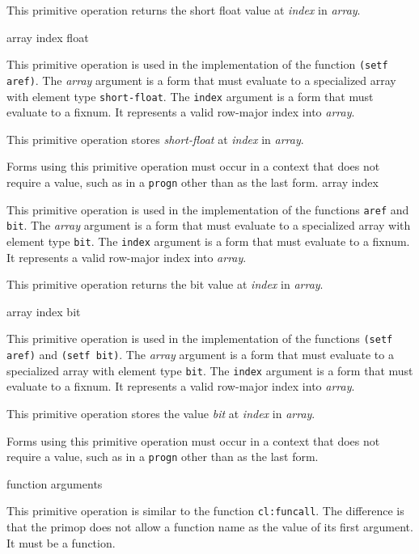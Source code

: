 This primitive operation returns the short float value at
\textit{index} in \textit{array}.

 {array index float}

This primitive operation is used in the implementation of the
\commonlisp{} function \texttt{(setf aref)}.  The \textit{array}
argument is a form that must evaluate to a specialized array with
element type \texttt{short-float}.  The \texttt{index} argument is a
form that must evaluate to a fixnum.  It represents a valid row-major
index into \textit{array}.

This primitive operation stores \textit{short-float} at \textit{index}
in \textit{array}.

Forms using this primitive operation must occur in a context that does
not require a value, such as in a \texttt{progn} other than as the
last form.
 {array index}

This primitive operation is used in the implementation of the
\commonlisp{} functions \texttt{aref} and \texttt{bit}.  The
\textit{array} argument is a form that must evaluate to a specialized
array with element type \texttt{bit}.  The \texttt{index} argument is
a form that must evaluate to a fixnum.  It represents a valid
row-major index into \textit{array}.

This primitive operation returns the bit value at \textit{index} in
\textit{array}.

 {array index bit}

This primitive operation is used in the implementation of the
\commonlisp{} functions \texttt{(setf aref)} and \texttt{(setf bit)}.
The \textit{array} argument is a form that must evaluate to a
specialized array with element type \texttt{bit}.  The \texttt{index}
argument is a form that must evaluate to a fixnum.  It represents a
valid row-major index into \textit{array}.

This primitive operation stores the value \textit{bit} at
\textit{index} in \textit{array}.

Forms using this primitive operation must occur in a context that does
not require a value, such as in a \texttt{progn} other than as the
last form.

 {function \rest arguments}

This primitive operation is similar to the function \texttt{cl:funcall}.
The difference is that the primop does not allow a function name as
the value of its first argument. It must be a function.

